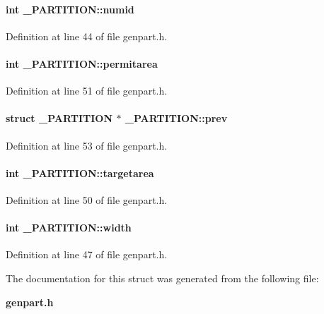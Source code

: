 \paragraph{\setlength{\rightskip}{0pt plus 5cm}int \_\-PARTITION::numid}\hfill



Definition at line 44 of file genpart.h.\label{_PARTITION_m8}
\paragraph{\setlength{\rightskip}{0pt plus 5cm}int \_\-PARTITION::permitarea}\hfill



Definition at line 51 of file genpart.h.\label{_PARTITION_m11}
\paragraph{\setlength{\rightskip}{0pt plus 5cm}struct \_\-PARTITION $\ast$ \_\-PARTITION::prev}\hfill



Definition at line 53 of file genpart.h.\label{_PARTITION_m7}
\paragraph{\setlength{\rightskip}{0pt plus 5cm}int \_\-PARTITION::targetarea}\hfill



Definition at line 50 of file genpart.h.\label{_PARTITION_m3}
\paragraph{\setlength{\rightskip}{0pt plus 5cm}int \_\-PARTITION::width}\hfill



Definition at line 47 of file genpart.h.

The documentation for this struct was generated from the following file:\begin{CompactItemize}
\item 
{\bf genpart.h}\end{CompactItemize}
